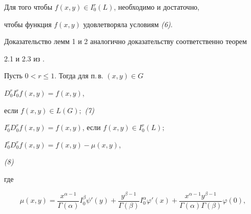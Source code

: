 


\begin{lem} Для того чтобы $f(x,y)\in I_0^r(L)$, необходимо и достаточно, 


чтобы функция $f(x,y)$ удовлетворяла условиям {\em (6)}. 


\end{lem} 


 


Доказательство лемм 1 и 2 аналогично доказательству соответственно теорем 


2.1 и 2.3 из \cite{Sam}. 


 


\begin{lem} Пусть $0<r\le 1$. Тогда для п.\,в. $(x,y)\in G$ 


\medskip 





 $D_0^rI_0^rf(x,y)=f(x,y)$, 


если $f(x,y)\in L(G);$ \hfill {\em (7)} 


\medskip


 


 $I_0^rD_0^rf(x,y)=f(x,y)$, если $f(x,y)\in I_0^r(L);$ 


\medskip


 


 $I^r_0D^r_0f(x,y)=f(x,y)-\mu(x,y)$, 


\hfill {\em (8)}


\medskip


 


\noindent где 


\begin{equation} 


\mu(x,y)=\frac{x^{\alpha-1}}{\Gamma(\alpha)}I_0^\beta\psi'(y)+ 


\frac{y^{\beta-1}}{\Gamma(\beta)}I_0^\alpha\varphi'(x)+ 


\frac{x^{\alpha-1}y^{\beta-1}}{\Gamma(\alpha)\Gamma(\beta)} 


\varphi(0), 


\tag{9} 


\end{equation} 






\end{lem}
